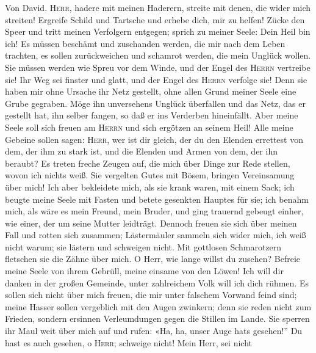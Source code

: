  Von David. \textsc{Herr}, hadere mit meinen Haderern,
streite mit denen, die wider mich streiten!  Ergreife
Schild und Tartsche und erhebe dich, mir zu helfen!  Zücke
den Speer und tritt meinen Verfolgern entgegen; sprich zu meiner Seele:
Dein Heil bin ich!  Es müssen beschämt und zuschanden
werden, die mir nach dem Leben trachten, es sollen zurückweichen und
schamrot werden, die mein Unglück wollen.  Sie müssen
werden wie Spreu vor dem Winde, und der Engel des \textsc{Herrn}
vertreibe sie!  Ihr Weg sei finster und glatt, und der
Engel des \textsc{Herrn} verfolge sie!  Denn sie haben mir
ohne Ursache ihr Netz gestellt, ohne allen Grund meiner Seele eine Grube
gegraben.  Möge ihn unversehens Unglück überfallen und das
Netz, das er gestellt hat, ihn selber fangen, so daß er ins Verderben
hineinfällt.  Aber meine Seele soll sich freuen am
\textsc{Herrn} und sich ergötzen an seinem Heil!  Alle
meine Gebeine sollen sagen: \textsc{Herr}, wer ist dir gleich, der du
den Elenden errettest von dem, der ihm zu stark ist, und die Elenden und
Armen von dem, der ihn beraubt?  Es treten freche Zeugen
auf, die mich über Dinge zur Rede stellen, wovon ich nichts weiß.
 Sie vergelten Gutes mit Bösem, bringen Vereinsamung über
mich!  Ich aber bekleidete mich, als sie krank waren, mit
einem Sack; ich beugte meine Seele mit Fasten und betete gesenkten
Hauptes für sie;  ich benahm mich, als wäre es mein
Freund, mein Bruder, und ging trauernd gebeugt einher, wie einer, der um
seine Mutter leidträgt.  Dennoch freuen sie sich über
meinen Fall und rotten sich zusammen; Lästermäuler sammeln sich wider
mich, ich weiß nicht warum; sie lästern und schweigen nicht.
 Mit gottlosen Schmarotzern fletschen sie die Zähne über
mich.  O Herr, wie lange willst du zusehen? Befreie meine
Seele von ihrem Gebrüll, meine einsame von den Löwen! 
Ich will dir danken in der großen Gemeinde, unter zahlreichem Volk will
ich dich rühmen.  Es sollen sich nicht über mich freuen,
die mir unter falschem Vorwand feind sind; meine Hasser sollen
vergeblich mit den Augen zwinkern;  denn sie reden nicht
zum Frieden, sondern ersinnen Verleumdungen gegen die Stillen im Lande.
 Sie sperren ihr Maul weit über mich auf und rufen: «Ha,
ha, unser Auge hat\textquotesingle s gesehen!''  Du hast
es auch gesehen, o \textsc{Herr}; schweige nicht! Mein Herr, sei nicht
